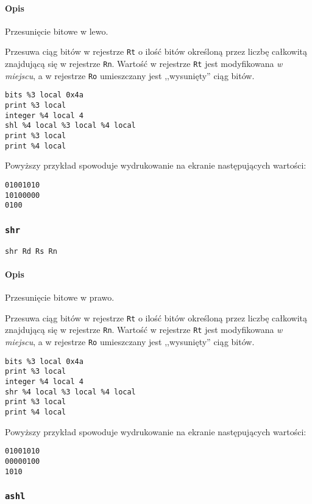 \paragraph*{Opis} Przesunięcie bitowe w lewo.

Przesuwa ciąg bitów w rejestrze \texttt{Rt} o ilość bitów określoną przez liczbę
całkowitą znajdującą się w rejestrze \texttt{Rn}. Wartość w rejestrze
\texttt{Rt} jest modyfikowana \emph{w miejscu}, a w rejestrze \texttt{Ro}
umieszczany jest ,,wysunięty'' ciąg bitów.
\begin{lstlisting}
bits %3 local 0x4a
print %3 local
integer %4 local 4
shl %4 local %3 local %4 local
print %3 local
print %4 local
\end{lstlisting}

Powyższy przykład spowoduje wydrukowanie na ekranie następujących wartości:
\begin{lstlisting}
01001010
10100000
0100
\end{lstlisting}

\subsubsection{\texttt{shr}}

\begin{lstlisting}
shr Rd Rs Rn
\end{lstlisting}

\paragraph*{Opis} Przesunięcie bitowe w prawo.

Przesuwa ciąg bitów w rejestrze \texttt{Rt} o ilość bitów określoną przez liczbę
całkowitą znajdującą się w rejestrze \texttt{Rn}. Wartość w rejestrze
\texttt{Rt} jest modyfikowana \emph{w miejscu}, a w rejestrze \texttt{Ro}
umieszczany jest ,,wysunięty'' ciąg bitów.
\begin{lstlisting}
bits %3 local 0x4a
print %3 local
integer %4 local 4
shr %4 local %3 local %4 local
print %3 local
print %4 local
\end{lstlisting}

Powyższy przykład spowoduje wydrukowanie na ekranie następujących wartości:
\begin{lstlisting}
01001010
00000100
1010
\end{lstlisting}

\subsubsection{\texttt{ashl}}

